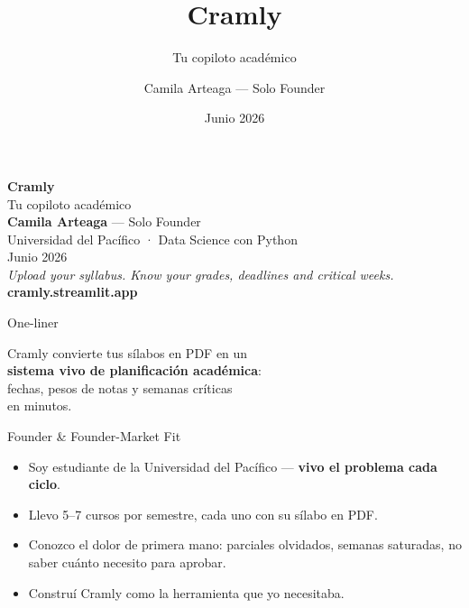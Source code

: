 \documentclass[aspectratio=169]{beamer}
\title{\textbf{Cramly}}
\subtitle{Tu copiloto académico}
\author[Camila Arteaga]{Camila Arteaga — Solo Founder}
\institute{Universidad del Pacífico · Data Science con Python}
\date{Junio 2026}
\begin{document}
\begin{frame}[plain]
  \begin{center}
    \vspace{1.0cm}
    {\Huge \textbf{\textcolor{cramlyIndigo}{Cramly}}}\\[0.4cm]
    {\Large \textcolor{cramlyDark}{Tu copiloto académico}}\\[1.0cm]
    \normalsize \textbf{Camila Arteaga} — Solo Founder\\[0.25cm]
    \footnotesize Universidad del Pacífico · Data Science con Python\\[0.15cm]
    \footnotesize Junio 2026\\[1.0cm]
    \textit{\small Upload your syllabus. Know your grades, deadlines and critical weeks.}\\[0.35cm]
    \textcolor{cramlyIndigo}{\textbf{cramly.streamlit.app}}
  \end{center}
\end{frame}

\begin{frame}{One-liner}
  \begin{center}
    \Large
    Cramly convierte tus sílabos en PDF en un\\
    \textbf{sistema vivo de planificación académica}:\\[0.4cm]
    \textcolor{cramlyIndigo}{fechas, pesos de notas y semanas críticas}\\ en minutos.
  \end{center}
\end{frame}

\begin{frame}{Founder \& Founder-Market Fit}
  \begin{itemize}
    \item Soy estudiante de la Universidad del Pacífico — \textbf{vivo el problema cada ciclo}.
    \item Llevo 5–7 cursos por semestre, cada uno con su sílabo en PDF.
    \item Conozco el dolor de primera mano: parciales olvidados, semanas saturadas, no saber cuánto necesito para aprobar.
    \item Construí Cramly como la herramienta que yo necesitaba.
  \end{itemize}
\end{frame}
\end{document}

